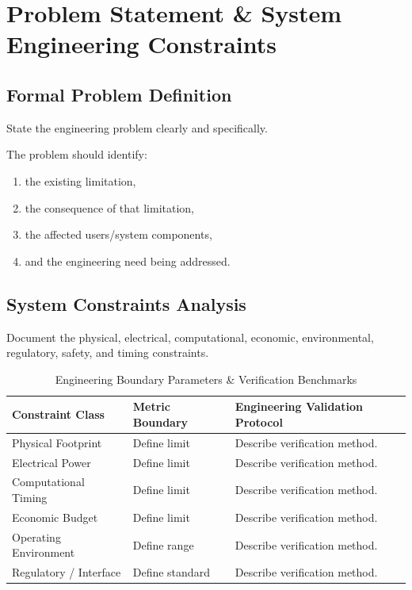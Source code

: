 
\section{Problem Statement \& System Engineering Constraints}

\subsection{Formal Problem Definition}

State the engineering problem clearly and specifically.

The problem should identify:
\begin{enumerate}
    \item the existing limitation,
    \item the consequence of that limitation,
    \item the affected users/system components,
    \item and the engineering need being addressed.
\end{enumerate}

\subsection{System Constraints Analysis}

Document the physical, electrical, computational, economic, environmental,
regulatory, safety, and timing constraints.

\begin{table}[!htbp]
    \centering
    \small
    \renewcommand{\arraystretch}{1.5}
    \begin{tabular}{p{3.5cm}p{3cm}p{8cm}}
        \toprule
        \textbf{Constraint Class} &
        \textbf{Metric Boundary} &
        \textbf{Engineering Validation Protocol} \\
        \midrule
        Physical Footprint & Define limit & Describe verification method. \\
        Electrical Power & Define limit & Describe verification method. \\
        Computational Timing & Define limit & Describe verification method. \\
        Economic Budget & Define limit & Describe verification method. \\
        Operating Environment & Define range & Describe verification method. \\
        Regulatory / Interface & Define standard & Describe verification method. \\
        \bottomrule
    \end{tabular}
    \caption{Engineering Boundary Parameters \& Verification Benchmarks}
\end{table}

